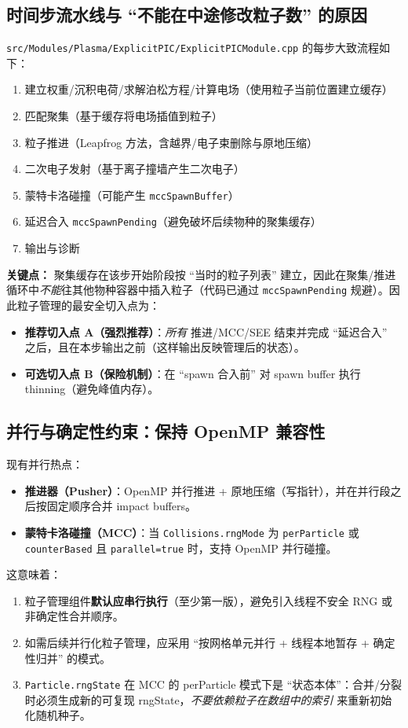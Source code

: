 \documentclass[UTF8,11pt,a4paper]{ctexart}
\begin{document}
\subsection{时间步流水线与 ``不能在中途修改粒子数'' 的原因}
\texttt{src/Modules/Plasma/ExplicitPIC/ExplicitPICModule.cpp} 的每步大致流程如下：
\begin{enumerate}[itemsep=2pt]
  \item 建立权重/沉积电荷/求解泊松方程/计算电场（使用粒子当前位置建立缓存）
  \item 匹配聚集（基于缓存将电场插值到粒子）
  \item 粒子推进（Leapfrog 方法，含越界/电子束删除与原地压缩）
  \item 二次电子发射（基于离子撞墙产生二次电子）
  \item 蒙特卡洛碰撞（可能产生 \texttt{mccSpawnBuffer}）
  \item 延迟合入 \texttt{mccSpawnPending}（避免破坏后续物种的聚集缓存）
  \item 输出与诊断
\end{enumerate}
\textbf{关键点：} 聚集缓存在该步开始阶段按 ``当时的粒子列表'' 建立，因此在聚集/推进循环中\emph{不能}往其他物种容器中插入粒子（代码已通过 \texttt{mccSpawnPending} 规避）。因此粒子管理的最安全切入点为：
\begin{itemize}[itemsep=2pt]
  \item \textbf{推荐切入点 A（强烈推荐）}：\emph{所有} 推进/MCC/SEE 结束并完成 ``延迟合入'' 之后，且在本步输出之前（这样输出反映管理后的状态）。
  \item \textbf{可选切入点 B（保险机制）}：在 ``spawn 合入前'' 对 spawn buffer 执行 thinning（避免峰值内存）。
\end{itemize}

\subsection{并行与确定性约束：保持 OpenMP 兼容性}
现有并行热点：
\begin{itemize}[itemsep=2pt]
  \item \textbf{推进器（Pusher）}：OpenMP 并行推进 + 原地压缩（写指针），并在并行段之后按固定顺序合并 impact buffers。
  \item \textbf{蒙特卡洛碰撞（MCC）}：当 \texttt{Collisions.rngMode} 为 \texttt{perParticle} 或 \texttt{counterBased} 且 \texttt{parallel=true} 时，支持 OpenMP 并行碰撞。
\end{itemize}
这意味着：
\begin{enumerate}[itemsep=2pt]
  \item 粒子管理组件\textbf{默认应串行执行}（至少第一版），避免引入线程不安全 RNG 或非确定性合并顺序。
  \item 如需后续并行化粒子管理，应采用 ``按网格单元并行 + 线程本地暂存 + 确定性归并'' 的模式。
  \item \texttt{Particle.rngState} 在 MCC 的 perParticle 模式下是 ``状态本体''：合并/分裂时必须生成新的可复现 rngState，\emph{不要依赖粒子在数组中的索引} 来重新初始化随机种子。
\end{enumerate}
\end{document}

